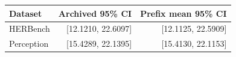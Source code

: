 \begin{tabular}{lrr}
\hline
Dataset & Archived 95\% CI & Prefix mean 95\% CI \\
\hline
HERBench & [12.1210, 22.6097] & [12.1125, 22.5909] \\
Perception & [15.4289, 22.1395] & [15.4130, 22.1153] \\
\hline
\end{tabular}

